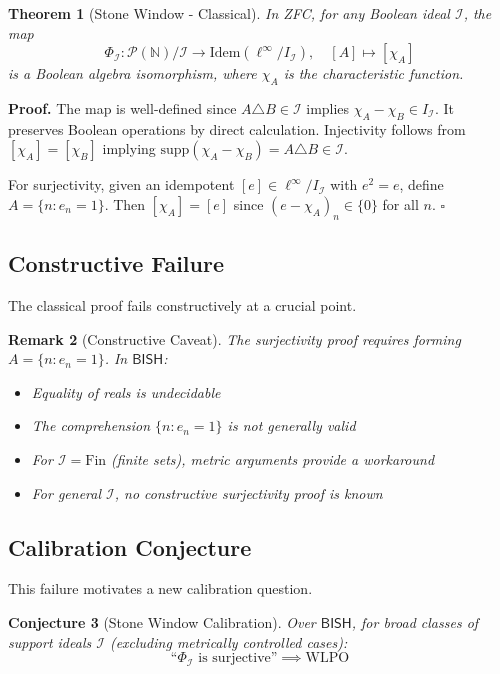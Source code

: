 \documentclass[11pt]{article}
\newtheorem{theorem}{Theorem}[section]
\newtheorem{conjecture}[theorem]{Conjecture}
\newtheorem{remark}[theorem]{Remark}
\newenvironment{proof}[1][Proof]{\noindent\textbf{#1.}\hspace{0.5em}}{\hfill$\square$\par}
\newcommand{\N}{\mathbb{N}}
\newcommand{\WLPO}{\mathrm{WLPO}}
\newcommand{\BISH}{\mathsf{BISH}}
\newcommand{\linf}{\ell^\infty}
\begin{document}
\begin{theorem}[Stone Window - Classical]\label{thm:stone-classical}
In ZFC, for any Boolean ideal $\mathcal{I}$, the map
\[
\Phi_{\mathcal{I}}: \mathcal{P}(\N)/\mathcal{I} \to \text{Idem}(\linf/I_{\mathcal{I}}), \quad [A] \mapsto [\chi_A]
\]
is a Boolean algebra isomorphism, where $\chi_A$ is the characteristic function.
\end{theorem}

\begin{proof}
The map is well-defined since $A \triangle B \in \mathcal{I}$ implies $\chi_A - \chi_B \in I_{\mathcal{I}}$. It preserves Boolean operations by direct calculation. Injectivity follows from $[\chi_A] = [\chi_B]$ implying $\text{supp}(\chi_A - \chi_B) = A \triangle B \in \mathcal{I}$.

For surjectivity, given an idempotent $[e] \in \linf/I_{\mathcal{I}}$ with $e^2 = e$, define $A = \{n : e_n = 1\}$. Then $[\chi_A] = [e]$ since $(e - \chi_A)_n \in \{0\}$ for all $n$.
\end{proof}

\subsection{Constructive Failure}

The classical proof fails constructively at a crucial point.

\begin{remark}[Constructive Caveat]
The surjectivity proof requires forming $A = \{n : e_n = 1\}$. In $\BISH$:
\begin{itemize}
\item Equality of reals is undecidable
\item The comprehension $\{n : e_n = 1\}$ is not generally valid
\item For $\mathcal{I} = \text{Fin}$ (finite sets), metric arguments provide a workaround
\item For general $\mathcal{I}$, no constructive surjectivity proof is known
\end{itemize}
\end{remark}

\subsection{Calibration Conjecture}

This failure motivates a new calibration question.

\begin{conjecture}[Stone Window Calibration]\label{conj:stone}
Over $\BISH$, for broad classes of support ideals $\mathcal{I}$ (excluding metrically controlled cases):
\[
\text{``}\Phi_{\mathcal{I}} \text{ is surjective''} \implies \WLPO
\]
\end{conjecture}
\end{document}
